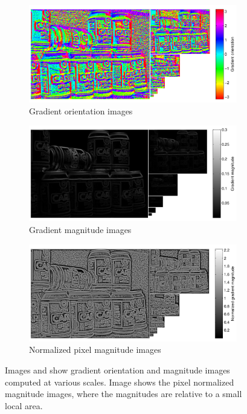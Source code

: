 \documentclass[thesis.tex]{subfiles}
\begin{document}
\begin{figure}[p]
    \centering
    \begin{subfigure}[t]{0.97\textwidth}
		\includegraphics[width=\textwidth]{img/cellHistScaleSpacesV.pdf}
    	\caption{Gradient orientation images}
    	\label{fig:cellHistScaleSpacesV}
	\end{subfigure}
    \begin{subfigure}[t]{0.97\textwidth}
		\includegraphics[width=\textwidth]{img/cellHistScaleSpacesM.pdf}
    	\caption{Gradient magnitude images}
    	\label{fig:cellHistScaleSpacesM}
	\end{subfigure}
	\begin{subfigure}[t]{0.97\textwidth}
		\includegraphics[width=\textwidth]{img/cellHistScaleSpacesMnorm.pdf}
    	\caption{Normalized pixel magnitude images}
    	\label{fig:cellHistScaleSpacesMnorm}
	\end{subfigure}
	\caption{Images  and  show gradient orientation and magnitude images computed at various scales. Image  shows the pixel normalized magnitude images, where the magnitudes are relative to a small local area.}
	\label{fig:cellHistScaleSpacesVM}
\end{figure}
\end{document}

